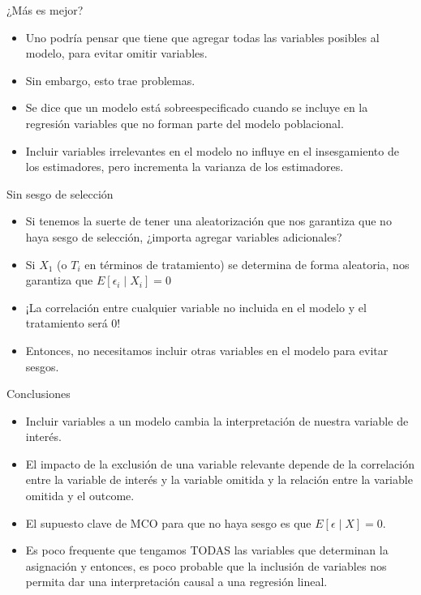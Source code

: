 \documentclass[10pt,aspectratio=169]{beamer}
\begin{document}
\begin{frame}{¿Más es mejor?}
    \begin{itemize}
        \item Uno podría pensar que tiene que agregar todas las variables posibles al modelo, para evitar omitir variables.
        \item Sin embargo, esto trae problemas.
        \item Se dice que un modelo está sobreespecificado cuando se incluye en la regresión variables que no forman parte del modelo poblacional.
        \item Incluir variables irrelevantes en el modelo no influye en el insesgamiento de los estimadores, pero  incrementa la varianza de los estimadores.
    \end{itemize}
\end{frame}

\begin{frame}{Sin sesgo de selección}
    \begin{itemize}
        \item Si tenemos la suerte de tener una aleatorización que nos garantiza que no haya sesgo de selección, ¿importa agregar variables adicionales?
        \item Si $X_{1}$ (o $T_{i}$ en t\'erminos de tratamiento) se determina de forma aleatoria, nos garantiza que $E\left[\epsilon_{i} \mid X_{i}\right]=0$
        \item ¡La correlaci\'on entre cualquier variable no incluida en el modelo y el tratamiento será 0!
        \item Entonces, no necesitamos incluir otras variables en el modelo para evitar sesgos.
      
    \end{itemize}
\end{frame}

\begin{frame}{Conclusiones}
    \begin{itemize}
        \item Incluir variables a un modelo cambia la interpretación de nuestra variable de interés.
        \item El impacto de la exclusión de una variable relevante depende de la correlación entre la variable de interés y la variable omitida y la relación entre la variable omitida y el outcome.
        \item El supuesto clave de MCO para que no haya sesgo es que $E[\epsilon \mid X]=0$.
               \item Es poco frequente que tengamos TODAS las variables que determinan la asignación y entonces, es poco probable que la inclusión de variables nos permita dar una interpretación causal a una regresión lineal.
    \end{itemize}
\end{frame}
\end{document}

